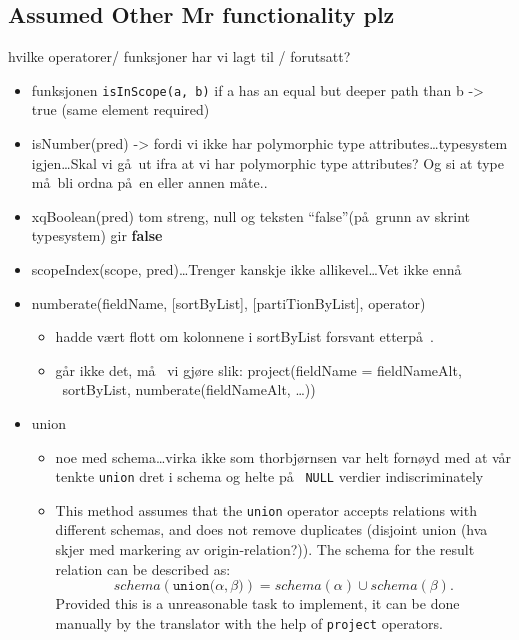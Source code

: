 \subsection{Assumed Other Mr functionality plz}
\label{sect:method:marsAddedOperators}
hvilke operatorer/ funksjoner har vi lagt til / forutsatt?
\begin{itemize}
  	\item funksjonen \verb!isInScope(a, b)! if a has an equal but deeper path than
		b -> true (same element required) 
	\item isNumber(pred) -> fordi vi ikke har polymorphic type attributes\ldots typesystem igjen\ldots Skal vi
	g\aa~ut ifra at vi har polymorphic type attributes? Og si at type m\aa~bli ordna p\aa~en eller annen m\aa te..
	\item xqBoolean(pred) tom streng, null og teksten ``false''(p\aa~grunn av skrint typesystem) gir \textbf{false}
	\item scopeIndex(scope, pred)\ldots Trenger kanskje ikke allikevel\ldots Vet ikke enn\aa
	\item numberate(fieldName, [sortByList], [partiTionByList], operator) 
		\begin{itemize}
        	\item hadde v\ae rt flott om kolonnene i sortByList forsvant etterp\aa~.
        	\item g\aa r ikke det, m\aa~ vi gj\o re slik: project(fieldName = fieldNameAlt, ~sortByList,
        	numberate(fieldNameAlt, \ldots))
        \end{itemize}
	\item union
		\begin{itemize}
			  \item noe med schema\ldots virka ikke som thorbj\o rnsen var helt forn\o yd
				  med at v\aa r tenkte \texttt{union} dret i schema og helte p\aa~
				  \texttt{NULL} verdier indiscriminately
			\item This method assumes that the \texttt{union} operator accepts relations with
different schemas, and does not remove duplicates (disjoint union (hva skjer med markering av origin-relation?)).
The schema for the result relation can be described as:
\begin{equation*}
schema(\texttt{union(}\alpha, \beta\texttt{)}) = schema(\alpha) \cup
schema(\beta).
\end{equation*}
Provided this is a
unreasonable task to implement, it can be done manually by the translator with
the help of \texttt{project} operators.		
        \end{itemize}	
\end{itemize}
